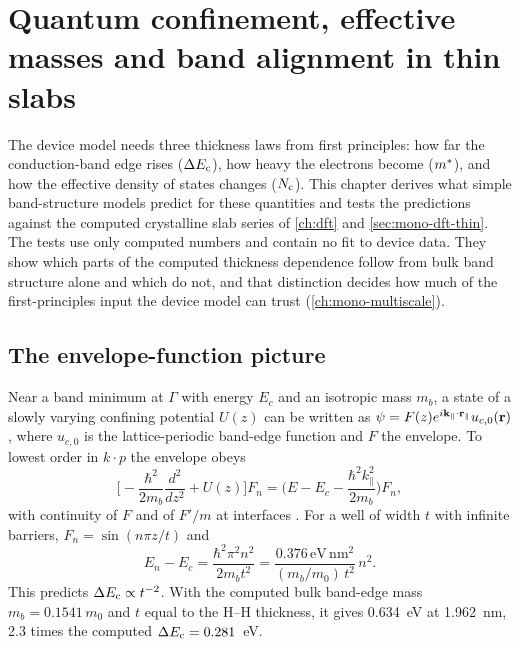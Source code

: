 \chapter{Quantum confinement, effective masses and band alignment in thin slabs}
\label{ch:mono-confinement-theory}

The device model needs three thickness laws from first principles: how far the conduction-band edge rises ($\Delta E_{\mathrm{c}}$),
how heavy the electrons become ($m^{*}$), and how the effective density of states changes ($N_{\mathrm{c}}$). This chapter
derives what simple band-structure models predict for these quantities and tests the predictions against the computed
crystalline slab series of \cref{ch:dft} and \cref{sec:mono-dft-thin}. The tests use only computed numbers and contain
no fit to device data. They show which parts of the computed thickness dependence follow from bulk band structure
alone and which do not, and that distinction decides how much of the first-principles input the device model can
trust (\cref{ch:mono-multiscale}).

\section{The envelope-function picture}
\label{sec:mono-conf-ema}

Near a band minimum at $\Gamma$ with energy $E_c$ and an isotropic mass $m_b$, a state of a slowly varying confining
potential $U(z)$ can be written as $\psi = F(z)e^{i\mathbf{k}_\parallel\cdot\mathbf{r}_\parallel}u_{c,0}(\mathbf{r})$, where $u_{c,0}$ is the
lattice-periodic band-edge function and $F$ the envelope. To lowest order in $k\cdot p$ the envelope obeys
\begin{equation}
\Big[-\frac{\hbar^2}{2m_b}\frac{d^2}{dz^2} + U(z)\Big]F_n = \Big(E - E_c - \frac{\hbar^2k_\parallel^2}{2m_b}\Big)F_n ,
\label{eq:mono-conf-envelope}
\end{equation}
with continuity of $F$ and of $F'/m$ at interfaces \citep{Bastard1981}. For a well of width $t$ with infinite barriers,
$F_n = \sin(n\pi z/t)$ and
\begin{equation}
E_n - E_c = \frac{\hbar^2\pi^2n^2}{2m_bt^2} = \frac{0.376\,\mathrm{eV\,nm^2}}{(m_b/m_0)\,t^2}\,n^2 .
\label{eq:mono-conf-inf}
\end{equation}
This predicts $\Delta E_{\mathrm{c}} \propto t^{-2}$. With the computed bulk band-edge mass $m_b = 0.1541\,m_0$  and $t$ equal
to the H--H thickness, it gives 0.634~eV at 1.962~nm, 2.3 times the computed $\Delta E_{\mathrm{c}} = 0.281$~eV.

